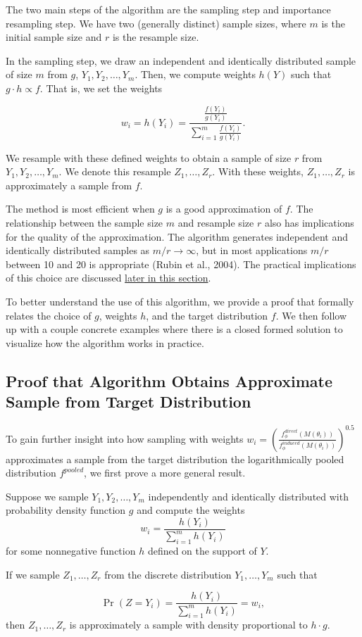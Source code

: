 \documentclass[12pt,twoside]{smiththesis}
\begin{document}
The two main steps of the algorithm are the sampling step and importance resampling step. We have two (generally distinct) sample sizes, where \(m\) is the initial sample size and \(r\) is the resample size.

In the sampling step, we draw an independent and identically distributed sample of size \(m\) from \(g\), \(Y_1, Y_2, \dots, Y_m\). Then, we compute weights \(h(Y)\) such that \(g \cdot h \propto f\). That is, we set the weights

\[w_i = h(Y_i) = \dfrac{\frac{f(Y_i) } {g(Y_i)} }{\sum_{i=1}^m\frac{f(Y_i) } {g(Y_i)} }.\]

We resample with these defined weights to obtain a sample of size \(r\) from \(Y_1, Y_2, \dots, Y_m\). We denote this resample \(Z_1,\dots, Z_r\). With these weights, \(Z_1,\dots, Z_r\) is approximately a sample from \(f\).

The method is most efficient when \(g\) is a good approximation of \(f\). The relationship between the sample size \(m\) and resample size \(r\) also has implications for the quality of the approximation. The algorithm generates independent and identically distributed samples as \(m/r \to \infty\), but in most applications \(m/r\) between 10 and 20 is appropriate (Rubin et al., 2004). The practical implications of this choice are discussed \protect\hyperlink{presamp}{later in this section}.

To better understand the use of this algorithm, we provide a proof that formally relates the choice of \(g\), weights \(h\), and the target distribution \(f\). We then follow up with a couple concrete examples where there is a closed formed solution to visualize how the algorithm works in practice.

\newpage

\hypertarget{proof}{%
\subsection{Proof that Algorithm Obtains Approximate Sample from Target Distribution}\label{proof}}

To gain further insight into how sampling with weights
\(w_i = \left( \frac{f_\phi^{direct}(M(\theta_i))}{f_\phi^{induced}(M(\theta_i))} \right)^{0.5}\)
approximates a sample from the target distribution the logarithmically pooled distribution \(f^{pooled}\), we first prove a more general result.
\begin{tcolorbox}[title=Sampling $g$ with weights defined by $h$]
Suppose we sample $Y_1, Y_2, \dots, Y_m$ independently and identically distributed with probability density function  $g$ and compute the weights
\[ w_i =\dfrac{h(Y_i)}{\sum_{i=1}^mh(Y_i) }\]
for some nonnegative function $h$ defined on the support of $Y$.

If  we sample $Z_1, \dots, Z_r$ from the discrete distribution $Y_1,\dots, Y_m$ such that 

\[ \Pr(Z = Y_i) = \dfrac{h(Y_i)}{\sum_{i=1}^mh(Y_i) } = w_i ,\]
then $Z_1, \dots, Z_r$ is approximately a sample with density proportional to $h \cdot g$.

\end{tcolorbox}
\vspace{5 mm}
\end{document}
